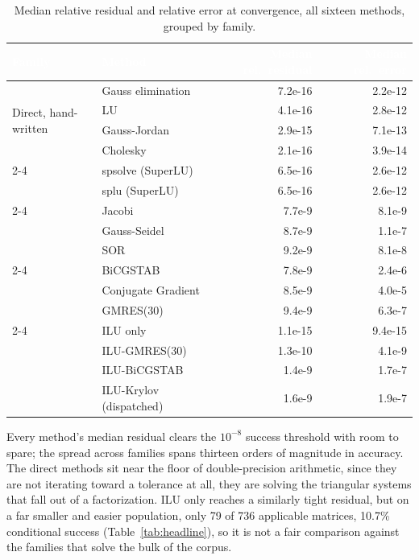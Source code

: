 \documentclass[11pt,a4paper]{article}
\newcommand{\hdrow}{\rowcolor{SBnavy}}
\newcommand{\hdtxt}[1]{\textcolor{white}{\bfseries #1}}
\begin{document}
\begin{table}[H]
\centering
\caption{Median relative residual and relative error at convergence, all sixteen methods,
grouped by family.}
\label{tab:residual-error}
\small
\begin{tabular}{@{}p{2.6cm}p{4.2cm}rr@{}}
\toprule
\hdrow \hdtxt{Family} & \hdtxt{Method} & \hdtxt{Median rel.\ residual} & \hdtxt{Median rel.\ error} \\
\midrule
\multirow{4}{2.6cm}{Direct, hand-written}
  & Gauss elimination & 7.2e-16 & 2.2e-12 \\
  & LU & 4.1e-16 & 2.8e-12 \\
  & Gauss-Jordan & 2.9e-15 & 7.1e-13 \\
  & Cholesky & 2.1e-16 & 3.9e-14 \\
\cmidrule(lr){2-4}
\multirow{2}{2.6cm}{Direct, library}
  & spsolve (SuperLU) & 6.5e-16 & 2.6e-12 \\
  & splu (SuperLU) & 6.5e-16 & 2.6e-12 \\
\cmidrule(lr){2-4}
\multirow{3}{2.6cm}{Stationary}
  & Jacobi & 7.7e-9 & 8.1e-9 \\
  & Gauss-Seidel & 8.7e-9 & 1.1e-7 \\
  & SOR & 9.2e-9 & 8.1e-8 \\
\cmidrule(lr){2-4}
\multirow{3}{2.6cm}{Krylov}
  & BiCGSTAB & 7.8e-9 & 2.4e-6 \\
  & Conjugate Gradient & 8.5e-9 & 4.0e-5 \\
  & GMRES(30) & 9.4e-9 & 6.3e-7 \\
\cmidrule(lr){2-4}
\multirow{4}{2.6cm}{Preconditioned (ILU)}
  & ILU only & 1.1e-15 & 9.4e-15 \\
  & ILU-GMRES(30) & 1.3e-10 & 4.1e-9 \\
  & ILU-BiCGSTAB & 1.4e-9 & 1.7e-7 \\
  & ILU-Krylov (dispatched) & 1.6e-9 & 1.9e-7 \\
\bottomrule
\end{tabular}
\end{table}

Every method's median residual clears the $10^{-8}$ success threshold with room to spare;
the spread across families spans thirteen orders of magnitude in accuracy. The direct
methods sit near the floor of double-precision arithmetic, since they are not iterating
toward a tolerance at all, they are solving the triangular systems that fall out of a
factorization. ILU only reaches a similarly tight residual, but on a far smaller and
easier population, only 79 of 736 applicable matrices, 10.7\% conditional success
(Table~\ref{tab:headline}), so it is not a fair comparison against the families that solve
the bulk of the corpus.
\end{document}
